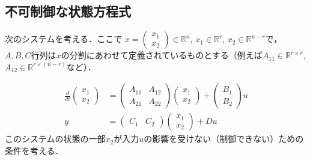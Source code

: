 \subsection{不可制御な状態方程式}

次のシステムを考える．ここで
$x = \left(\begin{array}{c} {x}_1 \\ {x}_2 \end{array}\right) \in {\mathbb R}^n$, 
$x_1 \in {\mathbb R}^r$, $x_2 \in {\mathbb R}^{n-r}$で，$A,B,C$行列は$x$の分割にあわせて定義されているものとする（例えば$A_{11} \in {\mathbb R}^{r \times r}$, $A_{12} \in {\mathbb R}^{r \times (n-r)}$など）．

\begin{align}
 \frac{d}{dt}
  \left(\begin{array}{c}
         {x}_1 \\
	 {x}_2
	\end{array}\right)
  &=
  \left(\begin{array}{cc}
         {A}_{11} & {A}_{12} \\
	     {A}_{21} & {A}_{22}
	\end{array}\right)
  \left(\begin{array}{c}
         {x}_1 \\
	 {x}_2
	\end{array}\right)
  +
  \left(\begin{array}{c}
         {B}_1 \\
	 {B}_2
	\end{array}\right)
  u \\
 y &=
  \left(\begin{array}{cc}
         {C}_1 & {C}_2
	\end{array}\right)
  \left(\begin{array}{c}
         {x}_1 \\
	 {x}_2
	\end{array}\right)
  + D u
\end{align}
このシステムの状態の一部$x_2$が入力$u$の影響を受けない（制御できない）ための条件を考える．

